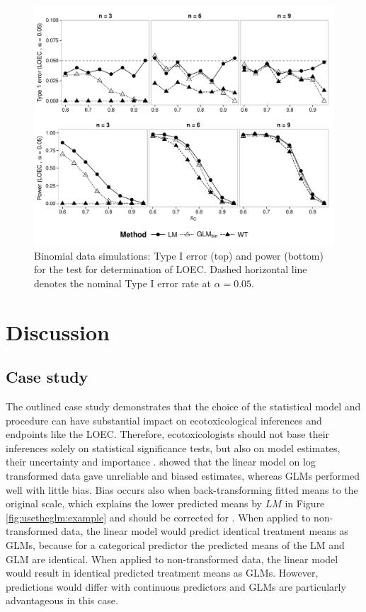 \begin{figure}
  \centering
  \includegraphics[width = \textwidth]{chapters/usetheglm/p_loec_p.pdf}
  \caption[Binomial data simulations: 
  Type I error and power for the test for determination of LOEC.]{
  Binomial data simulations: 
  Type I error (top) and power (bottom) for the test for determination of LOEC. 
  Dashed horizontal line denotes the nominal Type I error rate at $\alpha = 0.05$.
  }
  \label{fig:usetheglm:p_loec_p}
\end{figure}


\section{Discussion}
\label{sec:usetheglm:disc}
\subsection{Case study}
The outlined case study demonstrates that the choice of the statistical model and procedure can have substantial impact on ecotoxicological inferences and endpoints like the LOEC.
Therefore, ecotoxicologists should not base their inferences solely on statistical significance tests, but also on model estimates, their uncertainty and importance \citep{gelman_difference_2006}.
\citet{ohara_not_2010} showed that the linear model on log transformed data gave unreliable and biased estimates, whereas GLMs performed well with little bias.
Bias occurs also when back-transforming fitted means to the original scale, which explains the lower predicted means by $LM$ in Figure \ref{fig:usetheglm:example} \citep{rothery_cautionary_1988} and should be corrected for \citep{newman_regression_1993}.
When applied to non-transformed data, the linear model would predict identical treatment means as GLMs, because for a categorical predictor the predicted means of the LM and GLM are identical. 
When applied to non-transformed data, the linear model would result in identical predicted treatment means as GLMs. 
However, predictions would differ with continuous predictors and GLMs are particularly advantageous in this case.

